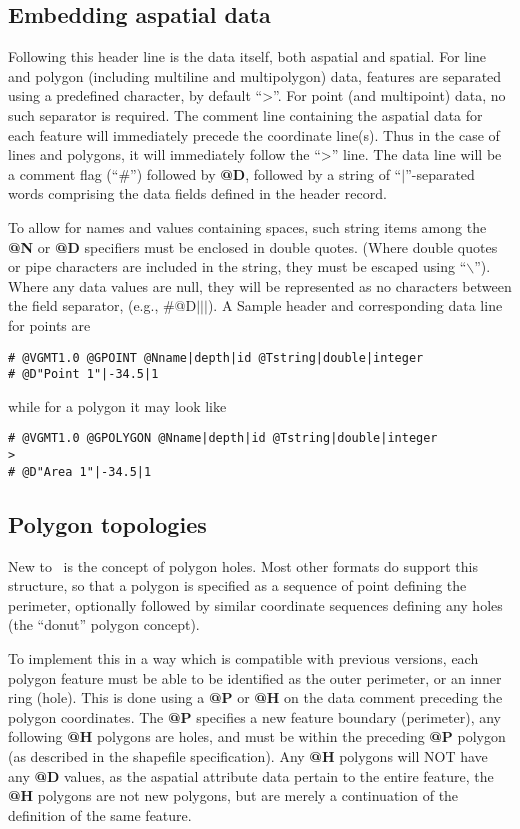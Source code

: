 \subsection{Embedding aspatial data}

Following this header line is the data itself, both aspatial and
spatial. For line and polygon (including multiline and multipolygon)
data, features are separated using a predefined character, by default
``{\textgreater}''. For point (and
multipoint) data, no such separator is required. The comment line
containing the aspatial data for each feature will immediately precede
the coordinate line(s). Thus in the case of lines and polygons, it will
immediately follow the ``{\textgreater}'' line. The data
line will be a comment flag (``\#'') followed by \textbf{@D}, followed by a string of
``$|$''-separated words comprising the data fields defined in the header record. 

To allow for names and values containing spaces, such string items among
the \textbf{@N} or \textbf{@D} specifiers must be enclosed in double quotes.
(Where double quotes or pipe characters are included in the string,
they must be escaped using ``$\backslash$''). Where any
data values are null, they will be represented as no characters between
the field separator, (e.g., \#@D$|$$|$$|$).  A Sample header and corresponding
data line for points are

\begin{verbatim}
# @VGMT1.0 @GPOINT @Nname|depth|id @Tstring|double|integer
# @D"Point 1"|-34.5|1
\end{verbatim}
\noindent
while for a polygon it may look like
\begin{verbatim}
# @VGMT1.0 @GPOLYGON @Nname|depth|id @Tstring|double|integer
>
# @D"Area 1"|-34.5|1
\end{verbatim}

\subsection{Polygon topologies}

New to \GMT\ is the concept of polygon holes.
Most other formats do support this structure, so that a polygon is
specified as a sequence of point defining the perimeter, optionally
followed by similar coordinate sequences defining any holes (the
``donut'' polygon concept). 

To implement this in a way which is compatible with previous \GMT versions,
each polygon feature must be able to be identified as the
outer perimeter, or an inner ring (hole). This is done using a \textbf{@P} or \textbf{@H}
on the data comment preceding the polygon coordinates. The \textbf{@P} specifies
a new feature boundary (perimeter), any following \textbf{@H} polygons are
holes, and must be within the preceding \textbf{@P} polygon (as described in the
shapefile specification). Any \textbf{@H} polygons will NOT have any \textbf{@D} values,
as the aspatial attribute data pertain to the entire feature, the \textbf{@H}
polygons are not new polygons, but are merely a continuation of the
definition of the same feature.

